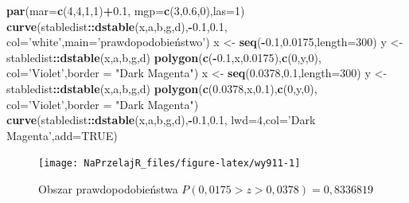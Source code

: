 \documentclass[polish,]{book}
\newenvironment{Shaded}{\begin{snugshade}}{\end{snugshade}}
\newcommand{\DataTypeTok}[1]{\textcolor[rgb]{0.13,0.29,0.53}{#1}}
\newcommand{\DecValTok}[1]{\textcolor[rgb]{0.00,0.00,0.81}{#1}}
\newcommand{\FloatTok}[1]{\textcolor[rgb]{0.00,0.00,0.81}{#1}}
\newcommand{\KeywordTok}[1]{\textcolor[rgb]{0.13,0.29,0.53}{\textbf{#1}}}
\newcommand{\NormalTok}[1]{#1}
\newcommand{\OperatorTok}[1]{\textcolor[rgb]{0.81,0.36,0.00}{\textbf{#1}}}
\newcommand{\OtherTok}[1]{\textcolor[rgb]{0.56,0.35,0.01}{#1}}
\newcommand{\StringTok}[1]{\textcolor[rgb]{0.31,0.60,0.02}{#1}}
\begin{document}
\begin{Shaded}
\begin{Highlighting}[]
\KeywordTok{par}\NormalTok{(}\DataTypeTok{mar=}\KeywordTok{c}\NormalTok{(}\DecValTok{4}\NormalTok{,}\DecValTok{4}\NormalTok{,}\DecValTok{1}\NormalTok{,}\DecValTok{1}\NormalTok{)}\OperatorTok{+}\FloatTok{0.1}\NormalTok{, }\DataTypeTok{mgp=}\KeywordTok{c}\NormalTok{(}\DecValTok{3}\NormalTok{,}\FloatTok{0.6}\NormalTok{,}\DecValTok{0}\NormalTok{),}\DataTypeTok{las=}\DecValTok{1}\NormalTok{)}
\KeywordTok{curve}\NormalTok{(stabledist}\OperatorTok{::}\KeywordTok{dstable}\NormalTok{(x,a,b,g,d),}\OperatorTok{-}\FloatTok{0.1}\NormalTok{,}\FloatTok{0.1}\NormalTok{,}
      \DataTypeTok{col=}\StringTok{'white'}\NormalTok{,}\DataTypeTok{main=}\StringTok{'prawdopodobieństwo'}\NormalTok{)}
\NormalTok{x <-}\StringTok{ }\KeywordTok{seq}\NormalTok{(}\OperatorTok{-}\FloatTok{0.1}\NormalTok{,}\FloatTok{0.0175}\NormalTok{,}\DataTypeTok{length=}\DecValTok{300}\NormalTok{)}
\NormalTok{y <-}\StringTok{ }\NormalTok{stabledist}\OperatorTok{::}\KeywordTok{dstable}\NormalTok{(x,a,b,g,d)}
\KeywordTok{polygon}\NormalTok{(}\KeywordTok{c}\NormalTok{(}\OperatorTok{-}\FloatTok{0.1}\NormalTok{,x,}\FloatTok{0.0175}\NormalTok{),}\KeywordTok{c}\NormalTok{(}\DecValTok{0}\NormalTok{,y,}\DecValTok{0}\NormalTok{),}
        \DataTypeTok{col=}\StringTok{'Violet'}\NormalTok{,}\DataTypeTok{border =} \StringTok{"Dark Magenta"}\NormalTok{)}
\NormalTok{x <-}\StringTok{ }\KeywordTok{seq}\NormalTok{(}\FloatTok{0.0378}\NormalTok{,}\FloatTok{0.1}\NormalTok{,}\DataTypeTok{length=}\DecValTok{300}\NormalTok{)}
\NormalTok{y <-}\StringTok{ }\NormalTok{stabledist}\OperatorTok{::}\KeywordTok{dstable}\NormalTok{(x,a,b,g,d)}
\KeywordTok{polygon}\NormalTok{(}\KeywordTok{c}\NormalTok{(}\FloatTok{0.0378}\NormalTok{,x,}\FloatTok{0.1}\NormalTok{),}\KeywordTok{c}\NormalTok{(}\DecValTok{0}\NormalTok{,y,}\DecValTok{0}\NormalTok{),}
        \DataTypeTok{col=}\StringTok{'Violet'}\NormalTok{,}\DataTypeTok{border =} \StringTok{"Dark Magenta"}\NormalTok{)}
\KeywordTok{curve}\NormalTok{(stabledist}\OperatorTok{::}\KeywordTok{dstable}\NormalTok{(x,a,b,g,d),}\OperatorTok{-}\FloatTok{0.1}\NormalTok{,}\FloatTok{0.1}\NormalTok{,}
      \DataTypeTok{lwd=}\DecValTok{4}\NormalTok{,}\DataTypeTok{col=}\StringTok{'Dark Magenta'}\NormalTok{,}\DataTypeTok{add=}\OtherTok{TRUE}\NormalTok{)}
\end{Highlighting}
\end{Shaded}

\begin{figure}[h]

{\centering \texttt{[image: NaPrzelajR\_files/figure-latex/wy911-1]} 

}

\caption{Obszar prawdopodobieństwa $P(0,0175>z>0,0378)=0,8336819$}\label{fig:wy911}
\end{figure}
\end{document}
